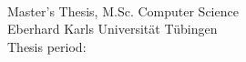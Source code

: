 \thispagestyle{empty}


\makeatletter
\vspace*{\fill}
\begin{flushleft}
\textbf{\@author}\\
\matrikelnummer\\
\emph{\@title}\\
Master's Thesis, M.Sc. Computer Science\\
Eberhard Karls Universität Tübingen\\
Thesis period: \thesisperiod
\end{flushleft}